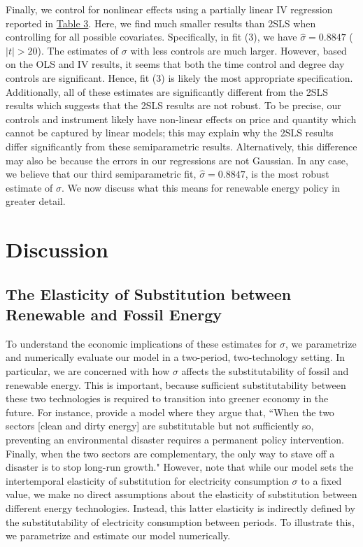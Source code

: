 \documentclass[11pt,a4paper]{extarticle}
\begin{document}
Finally, we control for nonlinear effects using a partially linear IV regression reported in \hyperref[table:3]{Table 3}. Here, we find much smaller results than 2SLS when controlling for all possible covariates. Specifically, in fit (3), we have $\hat{\sigma} = 0.8847$ ($|t| > 20$). The estimates of $\sigma$ with less controls are much larger. However, based on the OLS and IV results, it seems that both the time control and degree day controls are significant. Hence, fit (3) is likely the most appropriate specification. Additionally, all of these estimates are significantly different from the 2SLS results which suggests that the 2SLS results are not robust. To be precise, our controls and instrument likely have non-linear effects on price and quantity which cannot be captured by linear models; this may explain why the 2SLS results differ significantly from these semiparametric results. Alternatively, this difference may also be because the errors in our regressions are not Gaussian. In any case, we  believe that our third semiparametric fit, $\hat{\sigma} = 0.8847$, is the most robust estimate of $\sigma$. We now discuss what this means for renewable energy policy in greater detail. 

\pagebreak
\vspace{1em}
\section{Discussion}
\label{sec:Discussion}

\subsection{The Elasticity of Substitution between Renewable and Fossil Energy}


To understand the economic implications of these estimates for $\sigma$, we parametrize and numerically evaluate our model in a two-period, two-technology setting. In particular, we are concerned with how $\sigma$ affects the substitutability of fossil and renewable energy. This is important, because sufficient substitutability between these two technologies is required to transition into greener economy in the future. For instance, \citet{Ace2012} provide a model where they argue that, ``When the two
sectors [clean and dirty energy] are substitutable but not sufficiently so, preventing an environmental disaster requires a permanent policy intervention. Finally, when the two sectors are complementary, the only way to stave off a disaster is to stop long-run growth." However, note that while our model sets the intertemporal elasticity of substitution for  electricity consumption $\sigma$ to a fixed value, we make no direct assumptions about the elasticity of substitution between different energy technologies. Instead, this latter elasticity is indirectly defined by the substitutability of electricity consumption between periods. To illustrate this, we parametrize and estimate our model numerically.
\end{document}
